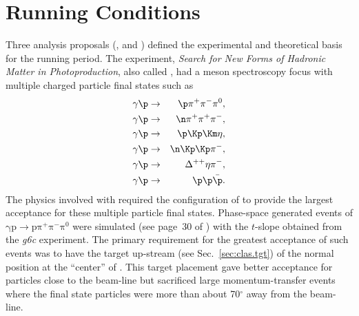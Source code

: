 \section{ Running Conditions}\label{sec:clas.g12}

Three  analysis proposals (\cite{clas.proposal.hyclas}, \cite{clas.proposal.superg} and \cite{clas.proposal.pion}) defined the experimental and theoretical basis for the  running period. \label{sec:clas.hyclas}The  experiment, \emph{Search for New Forms of Hadronic Matter in Photoproduction}, also called , had a meson spectroscopy focus with multiple charged particle final states such as
\begin{eqnarray}
    \gamma \p & \rightarrow & \p \pi^+ \pi^- \pi^0, \\
    \gamma \p & \rightarrow & \n \pi^+ \pi^+ \pi^-, \\
    \gamma \p & \rightarrow & \p \Kp \Km \eta, \\
    \gamma \p & \rightarrow & \n \Kp \Kp \pi^-, \\
    \gamma \p & \rightarrow & \Delta^{++} \eta \pi^-, \\
    \gamma \p & \rightarrow & \p \p \bar{\p}.
\end{eqnarray}
The physics involved with  required the configuration of  to provide the largest acceptance for these multiple particle final states. Phase-space generated events of $\mathrm{\gamma p \rightarrow p \pi^+ \pi^- \pi^0}$ were simulated (see page~30 of \cite{clas.proposal.hyclas}) with the $t$-slope obtained from the \textit{g6c} experiment. The primary requirement for the greatest acceptance of such events was to have the target up-stream (see Sec.~\ref{sec:clas.tgt}) of the normal position at the ``center'' of . This target placement gave better acceptance for particles close to the beam-line but sacrificed large momentum-transfer events where the final state particles were more than about 70$^\circ$ away from the beam-line.

